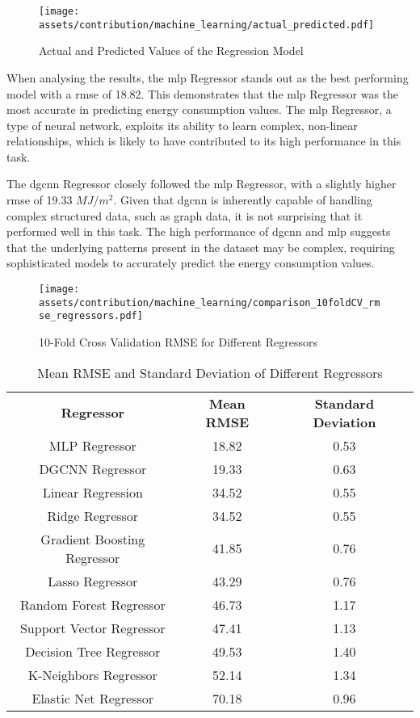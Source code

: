 \documentclass[a4paper, 12pt]{report}
\begin{document}
\begin{figure}
\centering
\texttt{[image: assets/contribution/machine\_learning/actual\_predicted.pdf]}
\caption{Actual and Predicted Values of the Regression Model}
\label{fig:actual-and-predicted-values-of-the-regression-model}
\end{figure}

When analysing the results, the \acrshort{mlp} Regressor stands out as the best performing model with a \acrshort{rmse} of 18.82. This demonstrates that the \acrshort{mlp} Regressor was the most accurate in predicting energy consumption values. The \acrshort{mlp} Regressor, a type of neural network, exploits its ability to learn complex, non-linear relationships, which is likely to have contributed to its high performance in this task.

The \acrshort{dgcnn} Regressor closely followed the \acrshort{mlp} Regressor, with a slightly higher \acrshort{rmse} of 19.33 $MJ/m^2$. Given that \acrshort{dgcnn} is inherently capable of handling complex structured data, such as graph data, it is not surprising that it performed well in this task. The high performance of \acrshort{dgcnn} and \acrshort{mlp} suggests that the underlying patterns present in the dataset may be complex, requiring sophisticated models to accurately predict the energy consumption values.

\begin{figure}
\centering
\texttt{[image: assets/contribution/machine\_learning/comparison\_10foldCV\_rmse\_regressors.pdf]}
\caption{10-Fold Cross Validation RMSE for Different Regressors}
\label{fig:10-fold-cross-validation-rmse-for-different-regressors}
\end{figure}

\begin{table}
\centering
\begin{tabular}{ ccc }
\textbf{Regressor} & \textbf{Mean RMSE} & \textbf{Standard Deviation} \\
MLP Regressor & 18.82 & 0.53 \\
\rowcolor[rgb]{0.93, 0.93, 0.93} DGCNN Regressor & 19.33 & 0.63 \\
Linear Regression & 34.52 & 0.55 \\
Ridge Regressor & 34.52 & 0.55 \\
Gradient Boosting Regressor & 41.85 & 0.76 \\
Lasso Regressor & 43.29 & 0.76 \\
Random Forest Regressor & 46.73 & 1.17 \\
Support Vector Regressor & 47.41 & 1.13 \\
Decision Tree Regressor & 49.53 & 1.40 \\
K-Neighbors Regressor & 52.14 & 1.34 \\
Elastic Net Regressor & 70.18 & 0.96 \\
\end{tabular}
\caption{Mean RMSE and Standard Deviation of Different Regressors}
\label{tab:regressor-performance}
\end{table}
\end{document}
